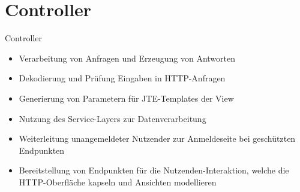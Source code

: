 \documentclass{sdqbeamer}
\begin{document}
\section{Controller}
\begin{frame}{Controller}
    \begin{itemize}
        \item Verarbeitung von Anfragen und Erzeugung von Antworten
        \item Dekodierung und Prüfung Eingaben in HTTP-Anfragen
        \item Generierung von Parametern für JTE-Templates der View
        \item Nutzung des Service-Layers zur Datenverarbeitung
        \item Weiterleitung unangemeldeter Nutzender zur Anmeldeseite bei geschützten Endpunkten
        \item Bereitstellung von Endpunkten für die Nutzenden-Interaktion, welche die HTTP-Oberfläche kapseln und Ansichten modellieren
    \end{itemize}
\end{frame}
\end{document}
